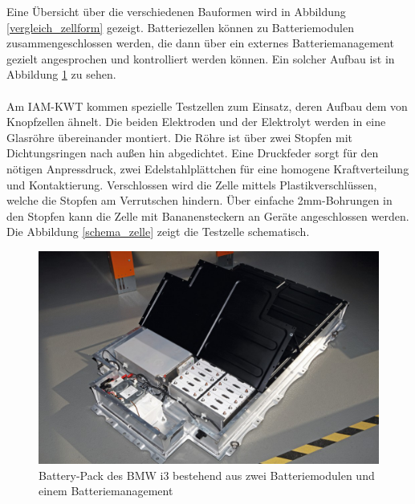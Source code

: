 \documentclass[a4paper, 11pt, headsepline,footsepline,twoside,abstract]{scrbook}
\begin{document}
Eine Übersicht über die verschiedenen Bauformen wird in Abbildung \ref{vergleich_zellform} gezeigt. Batteriezellen können zu Batteriemodulen zusammengeschlossen werden, die dann über ein externes Batteriemanagement gezielt angesprochen und kontrolliert werden können. Ein solcher Aufbau ist in Abbildung \ref{battery_pack} zu sehen.
\\\\
Am IAM-KWT kommen spezielle Testzellen zum Einsatz, deren Aufbau dem von Knopfzellen ähnelt. Die beiden Elektroden und der Elektrolyt werden in eine Glasröhre übereinander montiert. Die Röhre ist über zwei Stopfen mit Dichtungsringen nach außen hin abgedichtet. Eine Druckfeder sorgt für den nötigen Anpressdruck, zwei Edelstahlplättchen für eine homogene Kraftverteilung und Kontaktierung. Verschlossen wird die Zelle mittels Plastikverschlüssen, welche die Stopfen am Verrutschen hindern. Über einfache 2mm-Bohrungen in den Stopfen kann die Zelle mit Bananensteckern an Geräte angeschlossen werden. Die Abbildung \ref{schema_zelle} zeigt die Testzelle schematisch.
\begin{figure}
	\centering
	\includegraphics[width=0.9\columnwidth]{images/bmw-i3-battery-pack.png}
	\caption{Battery-Pack des BMW i3 bestehend aus zwei Batteriemodulen und einem Batteriemanagement}
	\label{battery_pack}
\end{figure}
\end{document}
